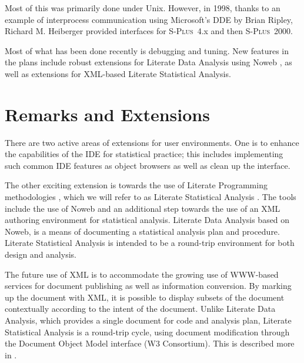 \documentclass{article}
\newcommand*{\Splus}{\textsc{S-Plus}}
\begin{document}
Most of this was primarily done under Unix.  However, in 1998, thanks
to an example of interprocess communication using Microsoft's DDE by
Brian Ripley, Richard M. Heiberger provided interfaces for \Splus~4.x
and then \Splus~2000.

Most of what has been done recently is debugging and tuning.  New
features in the plans include robust extensions for Literate Data
Analysis using Noweb \citep{NRamsey:1994}, as well as extensions for
XML-based Literate Statistical Analysis.

\section{Remarks and Extensions}
\label{sec:remarks}

There are two active areas of extensions for user environments.  One
is to enhance the capabilities of the IDE for statistical practice;
this includes implementing such common IDE features as object browsers
as well as clean up the interface.

The other exciting extension is towards the use of Literate
Programming methodologies \citep{Knuth:1992,NRamsey:1994}, which we
will refer to as Literate Statistical Analysis \citep{ross:lunt:2001}.
The tools include the use of Noweb \citep{NRamsey:1994} and an
additional step towards the use of an XML authoring environment for
statistical analysis.  Literate Data Analysis based on Noweb, is a
means of documenting a statistical analysis plan and procedure.
Literate Statistical Analysis is intended to be a round-trip
environment for both design and analysis.

The future use of XML is to accommodate the growing use of WWW-based
services for document publishing as well as information conversion.
By marking up the document with XML, it is possible to display subsets
of the document contextually according to the intent of the document.
Unlike Literate Data Analysis, which provides a single document for
code and analysis plan, Literate Statistical Analysis is a round-trip
cycle, using document modification through the Document Object Model
interface (W3 Consortium).  This is described more in
\citep{ross:lunt:2001}. 


\end{document}
